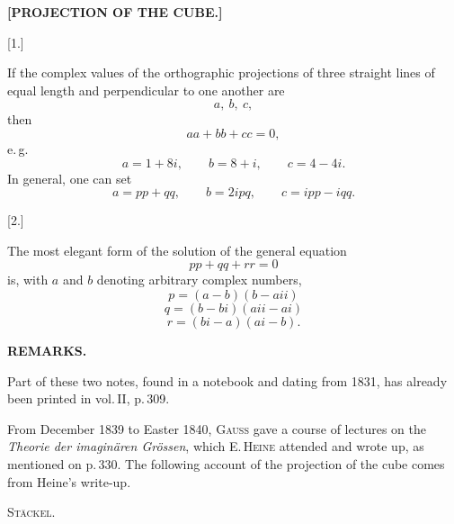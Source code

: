 \begin{center}\large\bfseries [PROJECTION OF THE CUBE.]\end{center}

\begin{center}[1.]\end{center}

If the complex values of the orthographic projections of three straight lines of equal length and perpendicular to one another are
\[
a,\ b,\ c,
\]
then
\[
aa+bb+cc=0,
\]
e.\,g.
\[
a=1+8i,\qquad b=8+i,\qquad c=4-4i.
\]
In general, one can set
\[
a=pp+qq,\qquad b=2ipq,\qquad c=ipp-iqq.
\]

\begin{center}[2.]\end{center}

The most elegant form of the solution of the general equation
\[
pp+qq+rr=0
\]
is, with $a$ and $b$ denoting arbitrary complex numbers,
\[
p=(a-b)(b-aii)
\]
\[
q=(b-bi)(aii-ai)
\]
\[
r=(bi-a)(ai-b).
\]

\begin{center}\bfseries REMARKS.\end{center}

Part of these two notes, found in a notebook and dating from 1831, has already been printed in vol.\,II, p.\,309.

\indent From December 1839 to Easter 1840, \textsc{Gauss} gave a course of lectures on the \emph{Theorie der imaginären Grössen}, which E.\,\textsc{Heine} attended and wrote up, as mentioned on p.\,330. The following account of the projection of the cube comes from Heine's write-up.
\par\noindent\hfill\textsc{Stäckel}.\par
